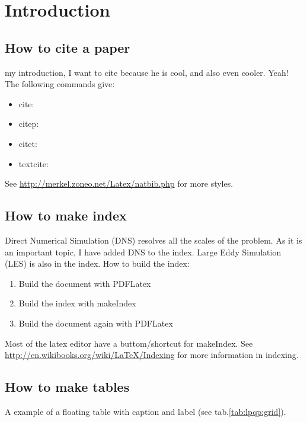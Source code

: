 \chapter{Introduction}
\label{sec: Introduction}

\section{How to cite a paper}
\label{sec: How to cite a paper}

my introduction, I want to cite \citep{Moeng2007} because he is cool, and also \textcite{Pope2000} even cooler. Yeah! The following commands  give:
\begin{itemize}
\item cite: \cite{Moeng2007}
\item citep: \citep{Moeng2007}	
\item citet: \citet{Moeng2007}	
\item textcite: \textcite{Moeng2007}	
\end{itemize}
See \url{http://merkel.zoneo.net/Latex/natbib.php} for more styles.

\section{How to make index}
\label{sec:How to make index}
Direct Numerical Simulation  (DNS) resolves all the scales of the problem. As it is an important topic, I have added DNS to the index. Large Eddy Simulation  (LES) is also in the index. How to build the index:
\begin{enumerate}
	\item Build the document with PDFLatex
	\item Build the index with makeIndex
	\item Build the document again with PDFLatex
\end{enumerate}
Most of the latex editor have a buttom/shortcut for makeIndex. See \url{http://en.wikibooks.org/wiki/LaTeX/Indexing} for more information in indexing.

\section{How to make tables}
\label{sec:How to make tables}
A example of a floating table with caption and label (see tab.\ref{tab:lpqp:grid}).

